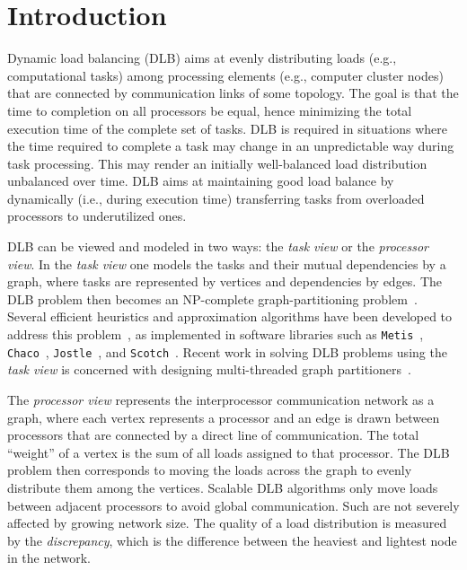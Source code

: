 \documentclass[12pt,psfig,a4]{article}
\theoremstyle{plain}
\begin{document}
\section{Introduction}
Dynamic load balancing (DLB) aims at evenly distributing loads (e.g., computational tasks) among processing elements (e.g., computer cluster nodes) that are connected by communication links of some topology. The goal is that the time to completion on all processors be equal, hence minimizing the total execution time of the complete set of tasks. DLB is required in situations where the time required to complete a task may change in an unpredictable way during task processing. This may render an initially well-balanced load distribution unbalanced over time. DLB aims at maintaining good load balance by dynamically (i.e., during execution time) transferring tasks from overloaded processors to underutilized ones. 

DLB can be viewed and modeled in two ways: the \textit{task view} or the \textit{processor view}. In the \textit{task view} one models the tasks and their mutual dependencies by a graph, where tasks are represented by vertices and dependencies by edges. The DLB problem then becomes an NP-complete graph-partitioning problem~\cite{gary1979computers}. Several efficient heuristics and approximation algorithms have been developed to address this problem~\cite{sanders2011engineering,karypis1999parallel,walshaw2000parallel,pellegrini2012pt}, as implemented in software libraries such as \texttt{Metis}~\cite{karypis1995metis}, \texttt{Chaco}~\cite{hendrickson1995multi}, \texttt{Jostle}~\cite{walshaw2007jostle}, and \texttt{Scotch}~\cite{pellegrini1996scotch}. Recent work in solving DLB problems using the \textit{task view} is concerned with designing multi-threaded graph partitioners~\cite{lasalle2013multi}. 

The \textit{processor view} represents the interprocessor communication network as a graph, where each vertex represents a processor and an edge is drawn between processors that are connected by a direct line of communication. The total ``weight'' of a vertex is the sum of all loads assigned to that processor. The DLB problem then corresponds to moving the loads across the graph to evenly distribute them among the vertices. Scalable DLB algorithms only move loads between adjacent processors to avoid global communication. Such are not severely affected by growing network size. The quality of a load distribution is measured by the \textit{discrepancy}, which is the difference between the heaviest and lightest node in the network.
\end{document}
